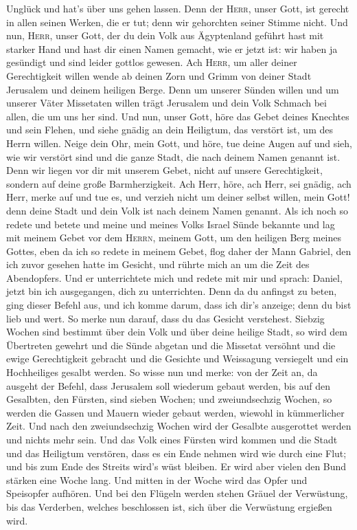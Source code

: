Unglück und hat's über uns gehen lassen. Denn der \textsc{Herr}, unser
Gott, ist gerecht in allen seinen Werken, die er tut; denn wir
gehorchten seiner Stimme nicht.  Und nun, \textsc{Herr},
unser Gott, der du dein Volk aus Ägyptenland geführt hast mit starker
Hand und hast dir einen Namen gemacht, wie er jetzt ist: wir haben ja
gesündigt und sind leider gottlos gewesen.  Ach
\textsc{Herr}, um aller deiner Gerechtigkeit willen wende ab deinen Zorn
und Grimm von deiner Stadt Jerusalem und deinem heiligen Berge. Denn um
unserer Sünden willen und um unserer Väter Missetaten willen trägt
Jerusalem und dein Volk Schmach bei allen, die um uns her sind.
 Und nun, unser Gott, höre das Gebet deines Knechtes und
sein Flehen, und siehe gnädig an dein Heiligtum, das verstört ist, um
des Herrn willen.  Neige dein Ohr, mein Gott, und höre,
tue deine Augen auf und sieh, wie wir verstört sind und die ganze Stadt,
die nach deinem Namen genannt ist. Denn wir liegen vor dir mit unserem
Gebet, nicht auf unsere Gerechtigkeit, sondern auf deine große
Barmherzigkeit.  Ach Herr, höre, ach Herr, sei gnädig,
ach Herr, merke auf und tue es, und verzieh nicht um deiner selbst
willen, mein Gott! denn deine Stadt und dein Volk ist nach deinem Namen
genannt.  Als ich noch so redete und betete und meine und
meines Volks Israel Sünde bekannte und lag mit meinem Gebet vor dem
\textsc{Herrn}, meinem Gott, um den heiligen Berg meines Gottes,
 eben da ich so redete in meinem Gebet, flog daher der
Mann Gabriel, den ich zuvor gesehen hatte im Gesicht, und rührte mich an
um die Zeit des Abendopfers.  Und er unterrichtete mich
und redete mit mir und sprach: Daniel, jetzt bin ich ausgegangen, dich
zu unterrichten.  Denn da du anfingst zu beten, ging
dieser Befehl aus, und ich komme darum, dass ich dir's anzeige; denn du
bist lieb und wert. So merke nun darauf, dass du das Gesicht verstehest.
 Siebzig Wochen sind bestimmt über dein Volk und über
deine heilige Stadt, so wird dem Übertreten gewehrt und die Sünde
abgetan und die Missetat versöhnt und die ewige Gerechtigkeit gebracht
und die Gesichte und Weissagung versiegelt und ein Hochheiliges gesalbt
werden.  So wisse nun und merke: von der Zeit an, da
ausgeht der Befehl, dass Jerusalem soll wiederum gebaut werden, bis auf
den Gesalbten, den Fürsten, sind sieben Wochen; und zweiundsechzig
Wochen, so werden die Gassen und Mauern wieder gebaut werden, wiewohl in
kümmerlicher Zeit.  Und nach den zweiundsechzig Wochen
wird der Gesalbte ausgerottet werden und nichts mehr sein. Und das Volk
eines Fürsten wird kommen und die Stadt und das Heiligtum verstören,
dass es ein Ende nehmen wird wie durch eine Flut; und bis zum Ende des
Streits wird's wüst bleiben.  Er wird aber vielen den
Bund stärken eine Woche lang. Und mitten in der Woche wird das Opfer und
Speisopfer aufhören. Und bei den Flügeln werden stehen Gräuel der
Verwüstung, bis das Verderben, welches beschlossen ist, sich über die
Verwüstung ergießen wird.

